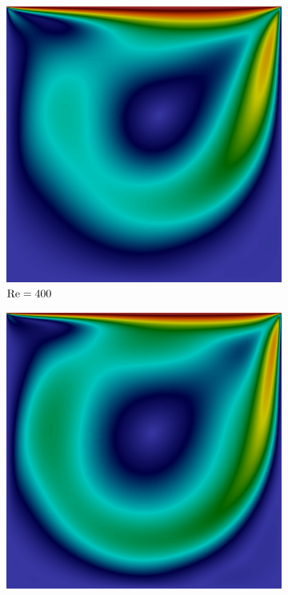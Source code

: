 \begin{figure}[h]
\begin{subfigure}{0.32\textwidth}
    \includegraphics[width=\linewidth]{Figuras/Cavity/Re400.png}
    \caption{$\mathrm{Re}=400$}
    \end{subfigure}
    \begin{subfigure}{0.32\textwidth}
    \includegraphics[width=\linewidth]{Figuras/Cavity/Re1000.png}

\end{subfigure}
\end{figure}
